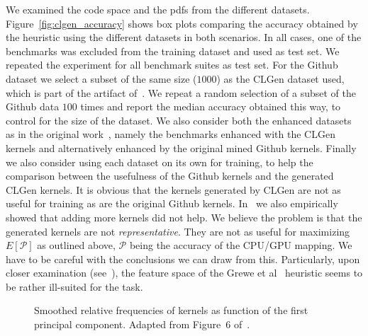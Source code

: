 We examined the code space and the \acp{pdf} from the different datasets. Figure~\ref{fig:clgen_accuracy} shows box plots comparing the accuracy obtained by the heuristic using the different datasets in both scenarios.
In all cases, one of the benchmarks was excluded from the training dataset and used as test set. We repeated the experiment for all benchmark suites as test set.
For the Github dataset we select a subset of the same size ($1000$) as the CLGen dataset used, which is part of the artifact of~\cite{cummins_cgo2017}.
We repeat a random selection of a subset of the Github data $100$ times and report the median accuracy obtained this way, to control for the size of the dataset.
We also consider both the enhanced datasets as in the original work~\cite{cummins_cgo2017}, namely the benchmarks enhanced with the CLGen kernels and alternatively enhanced by the original mined Github kernels.
Finally we also consider using each dataset on its own for training, to help the comparison between the usefulness of the Github kernels and the generated CLGen kernels. 
It is obvious that the kernels generated by CLGen are not as useful for training as are the original Github kernels.
In~\cite{goens_mapl19} we also empirically showed that adding more kernels did not help.
We believe the problem is that the generated kernels are not \emph{representative}.
They are not as useful for maximizing $E[\mathcal{P}]$ as outlined above, $\mathcal{P}$ being the accuracy of the \ac{CPU}/\ac{GPU} mapping.
We have to be careful with the conclusions we can draw from this.
Particularly, upon closer examination (see~\cite{goens_mapl19}), the feature space of the Grewe et al~\cite{grewe_cgo13} heuristic seems to be rather ill-suited for the task.

\begin{figure}[h]
	\centering
\resizebox{0.95\textwidth}{!}{
     
     }
   \caption{Smoothed relative frequencies of kernels as function of the first principal component. Adapted from Figure~6 of~\cite{goens_mapl19}.}
   \label{fig:clgen_pca}
\end{figure}

